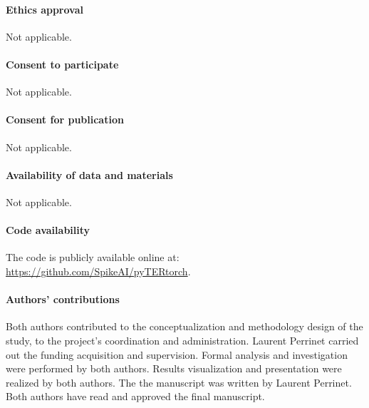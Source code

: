\documentclass[default]{sn-jnl}%
\theoremstyle{thmstyleone}%
\theoremstyle{thmstyletwo}%
\theoremstyle{thmstylethree}%
\begin{document}
\paragraph{Ethics approval}
Not applicable.

\paragraph{Consent to participate}
Not applicable.

\paragraph{Consent for publication}
Not applicable.

\paragraph{Availability of data and materials}
Not applicable.

\paragraph{Code availability}
%
The code is publicly available online at: \url{https://github.com/SpikeAI/pyTERtorch}.
%   
\paragraph{Authors' contributions}
%
Both authors contributed to the conceptualization and methodology design of the study, to the project's coordination and administration. Laurent Perrinet carried out the funding acquisition and supervision. Formal analysis and investigation were performed by both authors. Results visualization and presentation were realized by both authors. The the manuscript was written by Laurent Perrinet. Both authors have read and approved the final manuscript.


\end{document}
